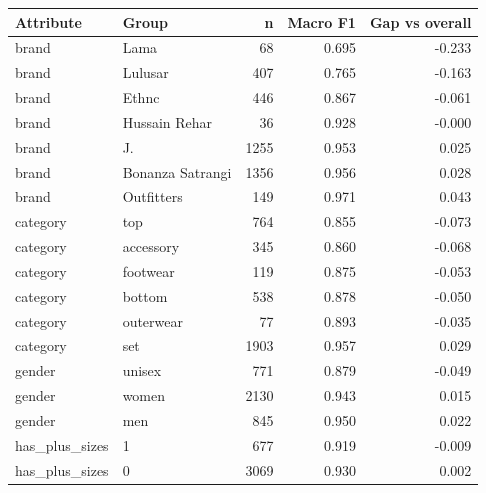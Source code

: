 \begin{tabular}{llrrr}
\toprule
Attribute & Group & n & Macro F1 & Gap vs overall \\
\midrule
brand & Lama & 68 & 0.695 & -0.233 \\
brand & Lulusar & 407 & 0.765 & -0.163 \\
brand & Ethnc & 446 & 0.867 & -0.061 \\
brand & Hussain Rehar & 36 & 0.928 & -0.000 \\
brand & J. & 1255 & 0.953 & 0.025 \\
brand & Bonanza Satrangi & 1356 & 0.956 & 0.028 \\
brand & Outfitters & 149 & 0.971 & 0.043 \\
category & top & 764 & 0.855 & -0.073 \\
category & accessory & 345 & 0.860 & -0.068 \\
category & footwear & 119 & 0.875 & -0.053 \\
category & bottom & 538 & 0.878 & -0.050 \\
category & outerwear & 77 & 0.893 & -0.035 \\
category & set & 1903 & 0.957 & 0.029 \\
gender & unisex & 771 & 0.879 & -0.049 \\
gender & women & 2130 & 0.943 & 0.015 \\
gender & men & 845 & 0.950 & 0.022 \\
has\_plus\_sizes & 1 & 677 & 0.919 & -0.009 \\
has\_plus\_sizes & 0 & 3069 & 0.930 & 0.002 \\
\bottomrule
\end{tabular}
